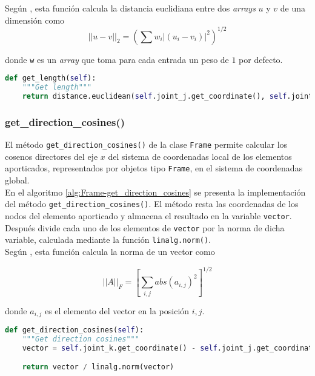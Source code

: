 Según \cite{2020SciPy-NMeth}, esta función calcula la distancia euclidiana entre dos \emph{arrays} $ u $ y $ v $ de una dimensión como
\begin{equation}
  {||u-v||}_2 = \left(\sum{w_i |(u_i - v_i)|^2}\right)^{1/2}
\end{equation}

donde \verb|w| es un \emph{array} que toma para cada entrada un peso de $ 1 $ por defecto.\\ 
\pagebreak

\begin{lstlisting}[language=Python,caption=Método \texttt{get\_length()} de la clase \texttt{Frame}.,label=alg:Frame-get_length, frame=single]
def get_length(self):
    """Get length"""
    return distance.euclidean(self.joint_j.get_coordinate(), self.joint_k.get_coordinate())
\end{lstlisting}

\subsubsection{get\_direction\_cosines()}
El método \verb|get_direction_cosines()| de la clase \verb|Frame| permite calcular los cosenos directores del eje $ x $ del sistema de coordenadas local de los elementos aporticados, representados por objetos tipo \verb|Frame|, en el sistema de coordenadas global.\\

En el algoritmo \ref{alg:Frame-get_direction_cosines} se presenta la implementación del método \verb|get_direction_cosines()|. El método resta las coordenadas de los nodos del elemento aporticado y almacena el resultado en la variable \verb|vector|. Después divide cada uno de los elementos de \verb|vector| por la norma de dicha variable, calculada mediante la función \verb|linalg.norm()|.\\

Según \cite{harris2020array}, esta función calcula la norma de un vector como

\begin{equation}
  {||A||}_F = \left[\sum_{i,j} abs(a_{i,j})^2\right]^{1/2}
\end{equation}

donde $ a_{i,j} $ es el elemento del vector en la posición $ i, j $.\\

\begin{lstlisting}[language=Python,caption=Método \texttt{get\_direction\_cosines()} de la clase \texttt{Frame}.,label=alg:Frame-get_direction_cosines, frame=single]
def get_direction_cosines(self):
    """Get direction cosines"""
    vector = self.joint_k.get_coordinate() - self.joint_j.get_coordinate()

    return vector / linalg.norm(vector)
\end{lstlisting}

